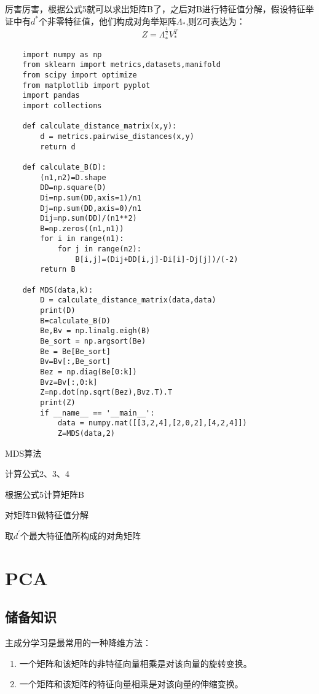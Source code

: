 \documentclass[a4paper]{article}
\begin{document}
	厉害厉害，根据公式5就可以求出矩阵B了，之后对B进行特征值分解，假设特征举证中有$d^*$个非零特征值，他们构成对角举矩阵$\Lambda _{*}$,则Z可表达为：
	\begin{equation}
	Z=\Lambda _{*}^{\frac{1}{2}}V_{*}^{T}
	\end{equation}
	
	\begin{lstlisting}
	import numpy as np
	from sklearn import metrics,datasets,manifold
	from scipy import optimize
	from matplotlib import pyplot
	import pandas
	import collections
	
	def calculate_distance_matrix(x,y):
		d = metrics.pairwise_distances(x,y)
		return d
	
	def calculate_B(D):
		(n1,n2)=D.shape
		DD=np.square(D)
		Di=np.sum(DD,axis=1)/n1
		Dj=np.sum(DD,axis=0)/n1
		Dij=np.sum(DD)/(n1**2)
		B=np.zeros((n1,n1))
		for i in range(n1):
			for j in range(n2):
				B[i,j]=(Dij+DD[i,j]-Di[i]-Dj[j])/(-2)
		return B
	
	def MDS(data,k):
		D = calculate_distance_matrix(data,data)
		print(D)
		B=calculate_B(D)
		Be,Bv = np.linalg.eigh(B)
		Be_sort = np.argsort(Be)
		Be = Be[Be_sort]
		Bv=Bv[:,Be_sort]
		Bez = np.diag(Be[0:k])
		Bvz=Bv[:,0:k]
		Z=np.dot(np.sqrt(Bez),Bvz.T).T
		print(Z)
		if __name__ == '__main__':
			data = numpy.mat([[3,2,4],[2,0,2],[4,2,4]])
			Z=MDS(data,2)
	\end{lstlisting}
	\begin{algorithm}[!h]
		\caption{MDS算法}
		计算公式2、3、4
		
		根据公式5计算矩阵B
		
		对矩阵B做特征值分解
		
		取$d^{'}$个最大特征值所构成的对角矩阵
	\end{algorithm}
	\section{PCA}
	\subsection{储备知识}
	
	主成分学习是最常用的一种降维方法：
	\begin{enumerate}
		\item 一个矩阵和该矩阵的非特征向量相乘是对该向量的旋转变换。
		\item 一个矩阵和该矩阵的特征向量相乘是对该向量的伸缩变换。
	\end{enumerate}
\end{document}
